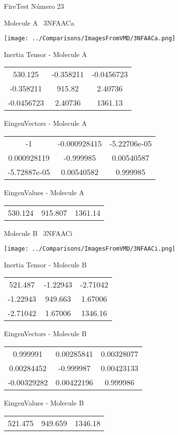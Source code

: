 \vtab[-3cm]
\begin{center}
{\large FireTest \tab Número 23}
\end{center}
\begin{multicols}{2}
\begin{center}

Molecule A \
3NFAACa

\texttt{[image: ../Comparisons/ImagesFromVMD/3NFAACa.png]}

Inertia Tensor - Molecule A \\
\begin{tabular}{|c c c|}
530.125	 & 	-0.358211	 & 	-0.0456723	 \\
-0.358211	 & 	915.82	 & 	2.40736	 \\
-0.0456723	 & 	2.40736	 & 	1361.13
\end{tabular}

\vtab
 EingenVectors - Molecule A     \\
\begin{tabular}{|c c c|}
-1	 & 	-0.000928415	 & 	-5.22706e-05	 \\
0.000928119	 & 	-0.999985	 & 	0.00540587	 \\
-5.72887e-05	 & 	0.00540582	 & 	0.999985
\end{tabular}

\vtab
 EingenValues - Molecule A     \\
\begin{tabular}{|c c c|}
530.124	 & 	915.807	 & 	1361.14	 \\
\end{tabular}
\columnbreak

Molecule B \
3NFAACi

\texttt{[image: ../Comparisons/ImagesFromVMD/3NFAACi.png]}

Inertia Tensor - Molecule B \\
\begin{tabular}{|c c c|}
521.487	 & 	-1.22943	 & 	-2.71042	 \\
-1.22943	 & 	949.663	 & 	1.67006	 \\
-2.71042	 & 	1.67006	 & 	1346.16
\end{tabular}

\vtab
 EingenVectors - Molecule B     \\
\begin{tabular}{|c c c|}
0.999991	 & 	0.00285841	 & 	0.00328077	 \\
0.00284452	 & 	-0.999987	 & 	0.00423133	 \\
-0.00329282	 & 	0.00422196	 & 	0.999986
\end{tabular}

\vtab
 EingenValues - Molecule B     \\
\begin{tabular}{|c c c|}
521.475	 & 	949.659	 & 	1346.18	 \\
\end{tabular}

\end{center}
\end{multicols}

